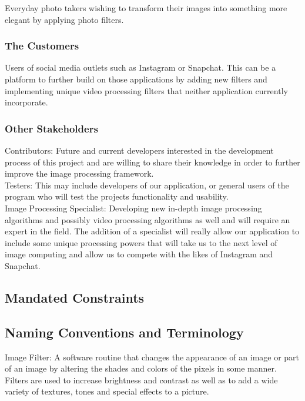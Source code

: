 \documentclass[12pt, titlepage]{article}
\begin{document}
Everyday photo takers wishing to transform their images into something more elegant by applying photo filters. 

\subsubsection{The Customers}

Users of social media outlets such as Instagram or Snapchat. This can be a platform to further build on those applications by adding new filters and implementing unique video processing filters that neither application currently incorporate. 

\subsubsection{Other Stakeholders}

Contributors: Future and current developers interested in the development process of this project and are willing to share their knowledge in order to further improve the image processing framework.\\


Testers: This may include developers of our application, or general users of the program who will test the projects functionality and usability.\\


Image Processing Specialist: Developing new in-depth image processing algorithms and possibly video processing algorithms as well and will require an expert in the field. The addition of a specialist will really allow our application to include some unique processing powers that will take us to the next level of image computing and allow us to compete with the likes of Instagram and Snapchat.


\subsection{Mandated Constraints}


\subsection{Naming Conventions and Terminology}

Image Filter: A software routine that changes the appearance of an image or part of an image by altering the shades and colors of the pixels in some manner. Filters are used to increase brightness and contrast as well as to add a wide variety of textures, tones and special effects to a picture.\\
\end{document}
